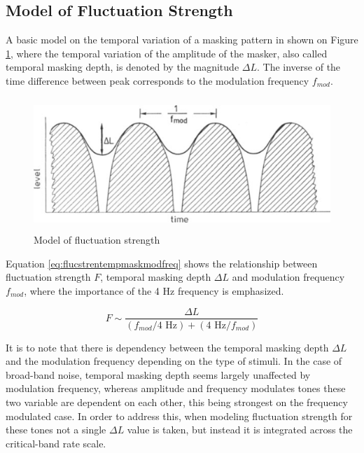 \subsection{Model of Fluctuation Strength}

A basic model on the temporal variation of a masking pattern in shown on Figure
\ref{fig:flucstrenmodel}, where the temporal variation of the amplitude of the
masker, also called temporal masking depth, is denoted by the magnitude
$\Delta L$. The inverse of the time difference between peak corresponds to the
modulation frequency $f_{mod}$.

\begin{figure}
    \centering
    \includegraphics[height=5cm]
        {img/Fastl2007-FluctuationStrengthModel}
    \caption{Model of fluctuation strength
        \cite[pp. 254]{Fastl2007Psychoacoustics}}
    \label{fig:flucstrenmodel}
\end{figure}

Equation \ref{eq:flucstrentempmaskmodfreq} shows the relationship between
fluctuation strength $F$, temporal masking depth $\Delta L$ and modulation
frequency $f_{mod}$, where the importance of the 4 Hz frequency is emphasized.

\begin{equation}
    F \sim \frac{\Delta L}{(f_{mod}/4\text{ Hz}) + (4\text{ Hz}/f_{mod})}
    \label{eq:flucstrentempmaskmodfreq}
\end{equation}

It is to note that there is dependency between the temporal masking depth
$\Delta L$ and the modulation frequency depending on the type of stimuli. In the
case of broad-band noise, temporal masking depth seems largely unaffected by 
modulation frequency, whereas amplitude and frequency modulates tones these two
variable are dependent on each other, this being strongest on the frequency
modulated case. In order to address this, when modeling fluctuation strength
for these tones not a single $\Delta L$ value is taken, but instead it is
integrated across the critical-band rate scale.

